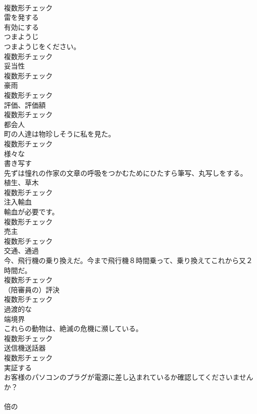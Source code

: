 \documentclass[8pt]{extreport}
\begin{document}
\begin{CJK}{UTF8}{min}
\\	複数形チェック
\\	[形容詞]	雷を発する	
\\	[動詞]	有効にする	
\\	[名詞]	つまようじ	
\\	つまようじをください。	
\\	複数形チェック
\\	[名詞]	妥当性	
\\	複数形チェック
\\	[名詞]	豪雨	
\\	複数形チェック
\\	[名詞]	評価、評価額	
\\	複数形チェック
\\	[名詞]	都会人	
\\	町の人達は物珍しそうに私を見た。	
\\	複数形チェック
\\	[副詞]	様々な	
\\	[動詞]	書き写す	
\\	先ずは憧れの作家の文章の呼吸をつかむためにひたすら筆写、丸写しをする。	
\\	[名詞]	植生、草木	
\\	複数形チェック
\\	[名詞]	注入輸血	
\\	輸血が必要です。	
\\	複数形チェック
\\	[名詞]	売主	
\\	複数形チェック
\\	[名詞]	交通、通過	
\\	今、飛行機の乗り換えだ。今まで飛行機８時間乗って、乗り換えてこれから又２時間だ。	
\\	複数形チェック
\\	[名詞]	（陪審員の）評決	
\\	複数形チェック
\\	[形容詞]	過渡的な	
\\	[名詞]	端境界	
\\	これらの動物は、絶滅の危機に瀕している。	
\\	複数形チェック
\\	[名詞]	送信機送話器	
\\	複数形チェック
\\	[動詞]	実証する	
\\	お客様のパソコンのプラグが電源に差し込まれているか確認してくださいませんか？	
\\	[形容詞]	
\\	倍の	

\end{CJK}
\end{document}
